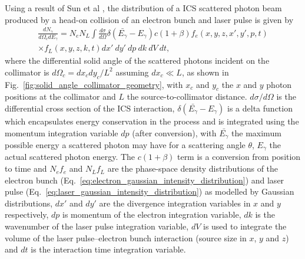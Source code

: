 \documentclass[../main.tex]{subfiles}
\begin{document}
Using a result of Sun et al \cite{sun2009characterizations,sun2011theoretical}, the distribution of a ICS scattered photon beam produced by a head-on collision of an electron bunch and laser pulse is given by
\begin{multline}
\frac{dN_{\gamma}}{d\Omega_{c} dE_{\gamma}} = N_{e}N_{L}\int \frac{d\sigma}{d\Omega}\delta\left(\bar{E_{\gamma}}-E_{\gamma}\right)c\left(1+\beta\right)f_{e}\left(x,y,z,x',y',p,t\right)\\ \times f_L\left(x,y,z,k,t\right)dx'~dy'~dp~dk~dV~dt,
\label{eq:central_distribution_sun}
\end{multline}
where the differential solid angle of the scattered photons incident on the collimator is $d\Omega_{c} = dx_{c}dy_{c}/L^{2}$ assuming $dx_{c} \ll L$, as shown in Fig.~\ref{fig:solid_angle_collimator_geometry}, with $x_{c}$ and $y_{c}$ the $x$ and $y$ photon positions at the collimator and $L$ the source-to-collimator distance. $d\sigma/d\Omega$ is the differential cross section of the ICS interaction, $\delta\left(\bar{E_{\gamma}}-E_{\gamma}\right)$ is a delta function which encapsulates energy conservation in the process and is integrated using the momentum integration variable $dp$ (after conversion), with $\bar{E_{\gamma}}$ the maximum possible energy a scattered photon may have for a scattering angle $\theta$,  $E_{\gamma}$ the actual scattered photon energy. The $c\left(1+\beta\right)$ term is a conversion from position to time and $N_{e}f_{e}$ and $N_{L}f_{L}$ are the phase-space density distributions of the electron bunch (Eq.~\ref{eq:electron_gaussian_intensity_distribution}) and laser pulse (Eq.~\ref{eq:laser_gaussian_intensity_distribution}) as modelled by Gaussian distributions, $dx'$ and $dy'$ are the divergence integration variables in $x$ and $y$ respectively, $dp$ is momentum of the electron integration variable, $dk$ is the wavenumber of the laser pulse integration variable, $dV$ is used to integrate the volume of the laser pulse--electron bunch interaction (source size in $x$, $y$ and $z$) and  $dt$ is the interaction time integration variable. 
\end{document}
